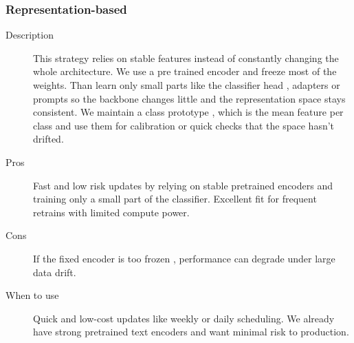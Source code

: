 \subsubsection*{Representation-based}
\begin{description}
  \item[Description] This strategy relies on stable features instead of constantly changing the whole architecture. We use a pre trained encoder and freeze most of the weights. Than learn only small parts like the classifier head , adapters or prompts so the backbone changes little and the representation space stays consistent.  We maintain a class prototype , which is the mean feature per class and use them for calibration or quick checks that the space hasn’t drifted.
  \item[Pros] Fast and low risk updates by relying on stable pretrained encoders and training only a small part of the classifier. Excellent fit for frequent retrains with limited compute power.
  \item[Cons] If the fixed encoder is too frozen , performance can degrade under large data drift.
  \item[When to use] Quick and low-cost updates like weekly or daily scheduling. We already have strong pretrained text encoders and want minimal risk to production.
\end{description}


